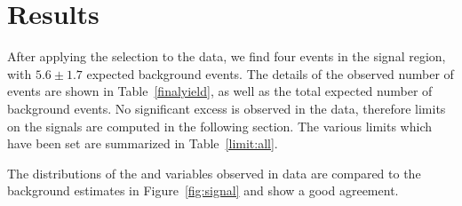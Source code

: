 

\section{Results}\label{sect:results}
After applying the selection to the data, we find four events in the signal region, with $5.6\pm1.7$ expected background events. 
The details of the observed number of events are shown in Table~\ref{finalyield}, as well as the total expected number of background events. 
No significant excess is observed in the data, therefore limits on the signals are computed in the following section.
The various limits which have been set are summarized in Table~\ref{limit:all}.

The distributions of the \met{} and \HT{} variables observed in data are compared to the background estimates in Figure~\ref{fig:signal} and show a good agreement.

